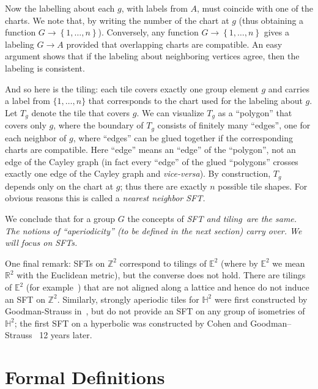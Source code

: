 \documentclass[12pt,reqno]{amsart}
\theoremstyle{plain}
\theoremstyle{definition}
\numberwithin{subcase}{case}
\theoremstyle{plain}
\theoremstyle{definition}
\begin{document}
Now the labelling about each \(g\), with labels from \(A\), must coincide with one of the charts. We note that, by writing the number of the chart at \(g\) (thus obtaining a function \(G \to \left\{1,\dots, n \right\}\)). Conversely, any function \(G \to \left\{1,\dots, n\right\}\) gives a labeling \(G \to A\)  provided that overlapping charts are compatible.  An easy argument shows that if the labeling about neighboring vertices agree, then the labeling is consistent.  

And so here is the tiling: each tile covers exactly one group element \(g\) and carries a label from \(\{1,\dots,n\}\) that corresponds to the chart used for the labeling about \(g\). Let \(T_{g}\) denote the tile that covers \(g\).  
We can visualize \(T_{g}\) as a ``polygon'' that covers only \(g\), where the boundary of \(T_{g}\) consists of finitely many ``edges'', one for each neighbor of \(g\), where ``edges'' can be glued together if the corresponding charts are compatible.  Here ``edge'' means an ``edge'' of the ``polygon'', not an edge of the Cayley graph (in fact every ``edge'' of the glued ``polygons'' crosses exactly one edge of the Cayley graph and {\it vice-versa}). 
By construction, \(T_{g}\) depends only on the chart at \(g\); thus there are exactly \(n\) possible tile shapes. For obvious reasons this is called  a \em nearest neighbor SFT\em.

We conclude that for a group \(G\) the concepts of \em SFT \em and \em tiling\em\ are the same. The notions of ``aperiodicity'' (to be defined in the next section) carry over. We will focus on SFTs.

\newpage

One final remark: SFTs on \(\mathbb{Z}^{2}\) correspond to tilings of \(\mathbb{E}^{2}\) (where by \(\mathbb{E}^{2}\) we mean \(\mathbb{R}^{2}\) with the Euclidean metric), but the converse does not hold. There are tilings of \(\mathbb{E}^{2}\) (for example~\cite{radin}) that are not aligned along a lattice and hence do not induce an SFT on \(\mathbb{Z}^{2}\). Similarly, strongly aperiodic tiles for \(\mathbb{H}^{2}\) were first constructed by Goodman-Strauss in~\cite{MR2142334}, but do not provide an SFT on any group of isometries of \(\mathbb{H}^{2}\); the first SFT on a hyperbolic was constructed by Cohen and Goodman--Strauss~\cite{MR3692905} 12 years later.






\section{Formal Definitions}
\end{document}

